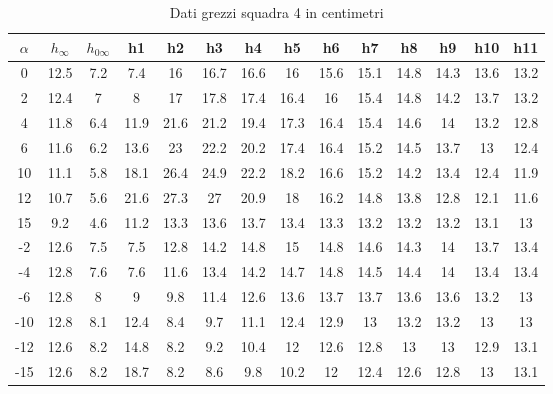 \begin{table}[H]
\centering
\begin{tabular}{|c|c|c|c|c|c|c|c|c|c|c|c|c|c|}
\hline
$\alpha$ & $h_\infty$ & $h_{0\infty}$ & h1   & h2   & h3   & h4   & h5   & h6   & h7   & h8   & h9   & h10  & h11  \\ \hline
0        & 12.5       & 7.2           & 7.4  & 16   & 16.7 & 16.6 & 16   & 15.6 & 15.1 & 14.8 & 14.3 & 13.6 & 13.2 \\ \hline
2        & 12.4       & 7             & 8    & 17   & 17.8 & 17.4 & 16.4 & 16   & 15.4 & 14.8 & 14.2 & 13.7 & 13.2 \\ \hline
4        & 11.8       & 6.4           & 11.9 & 21.6 & 21.2 & 19.4 & 17.3 & 16.4 & 15.4 & 14.6 & 14   & 13.2 & 12.8 \\ \hline
6        & 11.6       & 6.2           & 13.6 & 23   & 22.2 & 20.2 & 17.4 & 16.4 & 15.2 & 14.5 & 13.7 & 13   & 12.4 \\ \hline
10       & 11.1       & 5.8           & 18.1 & 26.4 & 24.9 & 22.2 & 18.2 & 16.6 & 15.2 & 14.2 & 13.4 & 12.4 & 11.9 \\ \hline
12       & 10.7       & 5.6           & 21.6 & 27.3 & 27   & 20.9 & 18   & 16.2 & 14.8 & 13.8 & 12.8 & 12.1 & 11.6 \\ \hline
15       & 9.2        & 4.6           & 11.2 & 13.3 & 13.6 & 13.7 & 13.4 & 13.3 & 13.2 & 13.2 & 13.2 & 13.1 & 13   \\ \hline
-2       & 12.6       & 7.5           & 7.5  & 12.8 & 14.2 & 14.8 & 15   & 14.8 & 14.6 & 14.3 & 14   & 13.7 & 13.4 \\ \hline
-4       & 12.8       & 7.6           & 7.6  & 11.6 & 13.4 & 14.2 & 14.7 & 14.8 & 14.5 & 14.4 & 14   & 13.4 & 13.4 \\ \hline
-6       & 12.8       & 8             & 9    & 9.8  & 11.4 & 12.6 & 13.6 & 13.7 & 13.7 & 13.6 & 13.6 & 13.2 & 13   \\ \hline
-10      & 12.8       & 8.1           & 12.4 & 8.4  & 9.7  & 11.1 & 12.4 & 12.9 & 13   & 13.2 & 13.2 & 13   & 13   \\ \hline
-12      & 12.6       & 8.2           & 14.8 & 8.2  & 9.2  & 10.4 & 12   & 12.6 & 12.8 & 13   & 13   & 12.9 & 13.1 \\ \hline
-15      & 12.6       & 8.2           & 18.7 & 8.2  & 8.6  & 9.8  & 10.2 & 12   & 12.4 & 12.6 & 12.8 & 13   & 13.1 \\ \hline
\end{tabular}
\caption{Dati grezzi squadra 4 in centimetri}
\end{table}

